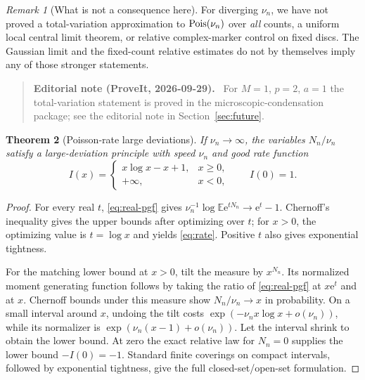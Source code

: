 \documentclass[11pt,a4paper]{article}
\numberwithin{equation}{section}
\newtheorem{theorem}{Theorem}[section]
\theoremstyle{definition}
\theoremstyle{remark}
\newtheorem{remark}[theorem]{Remark}
\newcommand{\ee}{\mathrm e}\newcommand{\dd}{\mathrm d}
\newcommand{\E}{\mathbb E}\newcommand{\Prob}{\mathbb P}
\newenvironment{ednote}{\par\smallskip\begin{quote}\small\raggedright\textbf{Editorial note (ProveIt, 2026-09-29).}\ }{\end{quote}\smallskip}
\begin{document}
\begin{remark}[What is not a consequence here]
For diverging $\nu_n$, we have not proved a total-variation approximation
to $\operatorname{Pois}(\nu_n)$ over \emph{all} counts, a uniform local central limit
theorem, or relative complex-marker control on fixed discs. The Gaussian
limit and the fixed-count relative estimates do not by themselves imply
any of those stronger statements.
\end{remark}
\begin{ednote}
For $M=1$, $p=2$, $a=1$ the total-variation statement is proved in the
microscopic-condensation package; see the editorial note in
Section~\ref{sec:future}.
\end{ednote}

\begin{theorem}[Poisson-rate large deviations]
\label{thm:ldp}
If $\nu_n\to\infty$, the variables $N_n/\nu_n$ satisfy a large-deviation
principle with speed $\nu_n$ and good rate function
\begin{equation}
 I(x)=\begin{cases}x\log x-x+1,&x\ge0,\\+\infty,&x<0,
 \end{cases}\qquad I(0)=1.
 \label{eq:rate}
\end{equation}
\end{theorem}
\begin{proof}
For every real $t$, \eqref{eq:real-pgf} gives
$\nu_n^{-1}\log\E\ee^{tN_n}\to\ee^t-1$.
Chernoff's inequality gives the upper bounds after optimizing over $t$;
for $x>0$, the optimizing value is $t=\log x$ and yields \eqref{eq:rate}.
Positive $t$ also gives exponential tightness.

For the matching lower bound at $x>0$, tilt the measure by $x^{N_n}$.
Its normalized moment generating function follows by taking the ratio of
\eqref{eq:real-pgf} at $x\ee^t$ and at $x$. Chernoff bounds under this
measure show $N_n/\nu_n\to x$ in probability. On a small interval around
$x$, undoing the tilt costs
$\exp(-\nu_n x\log x+o(\nu_n))$, while its normalizer is
$\exp(\nu_n(x-1)+o(\nu_n))$. Let the interval shrink to obtain the lower
bound. At zero the exact relative law for $N_n=0$ supplies the lower bound
$-I(0)=-1$. Standard finite coverings on compact intervals, followed by
exponential tightness, give the full closed-set/open-set formulation.
\end{proof}
\end{document}
